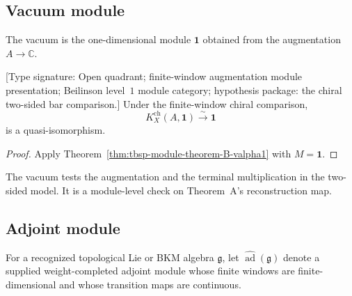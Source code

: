 \subsection{Vacuum module}
\label{subsec:tbsp-vacuum-module}

\begin{definition}
\label{def:tbsp-vacuum-comodule}
The vacuum is the one-dimensional module \(\mathbf1\) obtained from
the augmentation \(A\to\mathbb C\).
\end{definition}

\begin{theorem}
\label{thm:tbsp-theorem-B-vacuum}
\textup{[Type signature: Open quadrant; finite-window augmentation
module presentation; Beilinson level~\(1\) module category; hypothesis
package: the chiral two-sided bar comparison.]}
Under the finite-window chiral comparison,
\begin{equation}\label{eq:tbsp-theorem-B-vacuum}
 K_X^{\mathrm{ch}}(A,\mathbf1)
 \xrightarrow{\sim}\mathbf1
\end{equation}
is a quasi-isomorphism.
\end{theorem}

\begin{proof}
Apply Theorem~\ref{thm:tbsp-module-theorem-B-valpha1} with
\(M=\mathbf1\).
\end{proof}

\begin{remark}
\label{rem:tbsp-vacuum-base-case}
The vacuum tests the augmentation and the terminal multiplication in
the two-sided model.  It is a module-level check on Theorem~A's
reconstruction map.
\end{remark}

\subsection{Adjoint module}
\label{subsec:tbsp-adjoint-module}

\begin{definition}
\label{def:tbsp-adjoint-module}
For a recognized topological Lie or BKM algebra \(\mathfrak g\), let
\(\widehat{\operatorname{ad}}(\mathfrak g)\) denote a supplied
weight-completed adjoint module whose finite windows are
finite-dimensional and whose transition maps are continuous.
\end{definition}

